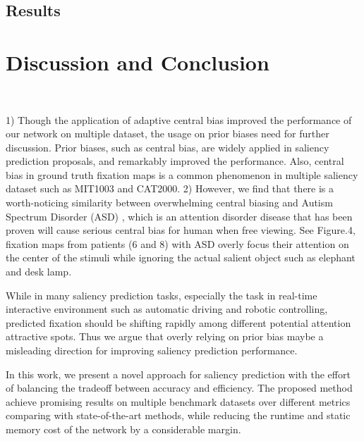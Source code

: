 \documentclass[twoside,twocolumn]{article}
\begin{document}
\subsection{Results}

\section{Discussion and Conclusion}\

\par 1) Though the application of adaptive central bias improved the performance of our network on multiple dataset, the usage on prior biases need for further discussion. Prior biases, such as central bias, are widely applied in saliency prediction proposals, and remarkably improved the performance. Also, central bias in ground truth fixation maps is a common phenomenon in multiple saliency dataset such as MIT1003 and CAT2000. 2) However, we find that there is a worth-noticing similarity between overwhelming central biasing and Autism Spectrum Disorder (ASD) \cite{wang2015}, which is an attention disorder disease that has been proven will cause serious central bias for human when free viewing. See Figure.4, fixation maps from patients (6 and 8) with ASD overly focus their attention on the center of the stimuli while ignoring the actual salient object such as elephant and desk lamp.

\par While in many saliency prediction tasks, especially the task in real-time interactive environment such as automatic driving and robotic controlling, predicted fixation should be shifting rapidly among different potential attention attractive spots. Thus we argue that overly relying on prior bias maybe a misleading direction for improving saliency prediction performance.

\par In this work, we present a novel approach for saliency prediction with the effort of balancing the tradeoff between accuracy and efficiency. The proposed method achieve promising results on multiple benchmark datasets over different metrics comparing with state-of-the-art methods, while reducing the runtime and static memory cost of the network by a considerable margin.



\end{document}
